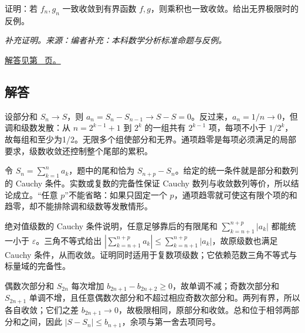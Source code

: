 \documentclass[UTF8,12pt,a4paper,fontset=fandol]{ctexart}
\begin{document}
\begin{example}[一致收敛乘积所需的有界性]\label{ex:c29q20}
证明：若 $f_n,g_n$ 一致收敛到有界函数 $f,g$，则乘积也一致收敛。给出无界极限时的反例。
\par\textit{补充证明。来源：编者补充：本科数学分析标准命题与反例。}\par\hyperref[ans:c29q20]{解答见第~\pageref{ans:c29q20} 页。}
\end{example}
\subsection{解答}
\begin{solve}\label{ans:c29q1}
设部分和 $S_n\to S$，则 $a_n=S_n-S_{n-1}\to S-S=0$。反过来，$a_n=1/n\to0$，但调和级数发散：从 $n=2^{k-1}+1$ 到 $2^k$ 的一组共有 $2^{k-1}$ 项，每项不小于 $1/2^k$，故每组和至少为1/2。无限多个组使部分和无界。通项趋零是每项必须满足的局部要求，级数收敛还控制整个尾部的累积。
\end{solve}

\begin{solve}\label{ans:c29q2}
令 $S_n=\sum_{k=1}^na_k$，题中的尾和恰为 $S_{n+p}-S_n$。给定的统一条件就是部分和数列的 Cauchy 条件。实数或复数的完备性保证 Cauchy 数列与收敛数列等价，所以结论成立。“任意 $p$”不能省略：如果只固定一个 $p$，通项趋零就可使这有限个项的和趋零，却不能排除调和级数等发散情形。
\end{solve}

\begin{solve}\label{ans:c29q3}
绝对值级数的 Cauchy 条件说明，任意足够靠后的有限尾和 $\sum_{k=n+1}^{n+p}|a_k|$ 都能统一小于 $\varepsilon$。三角不等式给出 $|\sum_{k=n+1}^{n+p}a_k|\le\sum_{k=n+1}^{n+p}|a_k|$，故原级数也满足 Cauchy 条件，从而收敛。证明同时适用于复数项级数；它依赖范数三角不等式与标量域的完备性。
\end{solve}

\begin{solve}\label{ans:c29q4}
偶数次部分和 $S_{2n}$ 每次增加 $b_{2n+1}-b_{2n+2}\ge0$，故单调不减；奇数次部分和 $S_{2n+1}$ 单调不增，且任意偶数次部分和不超过相应奇数次部分和。两列有界，所以各自收敛；它们之差 $b_{2n+1}\to0$，故极限相同，原部分和收敛。总和位于相邻两部分和之间，因此 $|S-S_n|\le b_{n+1}$，余项与第一舍去项同号。
\end{solve}
\end{document}
